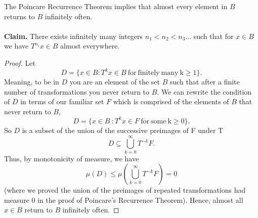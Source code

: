 \documentclass{article}
\begin{document}
The Poincare Recurrence Theorem implies that almost every element in $B$ returns to $B$ infinitely often. \\ \\
\textbf{Claim.} There exists infinitely many integers $n_1 < n_2 < n_3 ...$ such that for $x \in B$ we have
$T^{n_i}x \in B$ almost everywhere. 
\begin{proof}
Let $$D = \{x \in B : T^{k}x \in B\ \mathrm{for\ finitely\ many\ k \geq 1\}}.$$ 
Meaning, to be in $D$ you are an element of the set $B$ such that after a finite number of transformations you never return to $B$. 
We can rewrite the condition of $D$ in terms of our familiar set $F$ which is comprised of the elements of $B$ that never return to $B$,
$$D = \{x \in B\ : T^{k}x \in F\ \mathrm{for\ some\ k \geq 0\}}.$$
So $D$ is a subset of the union of the successive preimages of F under T $$D \subseteq \bigcup\limits_{k=0}^{\infty} T^{-k}F.$$ Thus, by monotonicity of measure, we have
$$ \mu(D) \leq \mu(\bigcup\limits_{k=0}^{\infty} T^{-k}F) = 0$$ (where we proved the union of the preimages of repeated transformations had measure 0 
in the proof of Poincare's Recurrence Theorem).
Hence, almost all $x \in B$ return to 
$B$ infinitely often. 

\end{proof}
\end{document}
